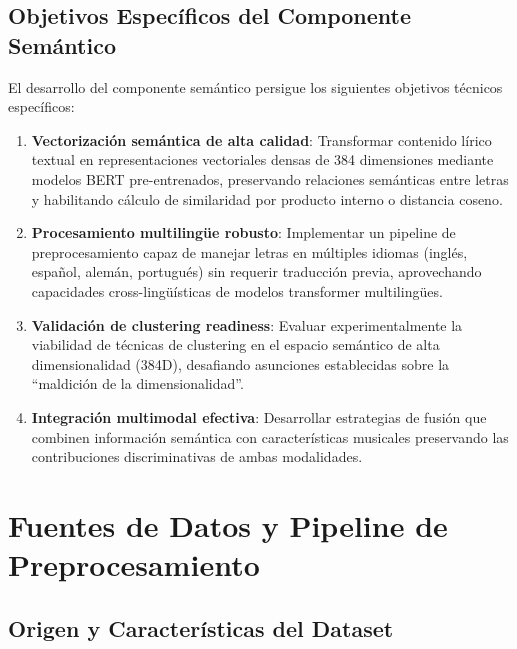 \subsection{Objetivos Específicos del Componente Semántico}
\label{subsec:objetivos-semantico}

El desarrollo del componente semántico persigue los siguientes objetivos técnicos específicos:

\begin{enumerate}
    \item \textbf{Vectorización semántica de alta calidad}: Transformar contenido lírico textual en representaciones vectoriales densas de 384 dimensiones mediante modelos BERT pre-entrenados, preservando relaciones semánticas entre letras y habilitando cálculo de similaridad por producto interno o distancia coseno.

    \item \textbf{Procesamiento multilingüe robusto}: Implementar un pipeline de preprocesamiento capaz de manejar letras en múltiples idiomas (inglés, español, alemán, portugués) sin requerir traducción previa, aprovechando capacidades cross-lingüísticas de modelos transformer multilingües.

    \item \textbf{Validación de clustering readiness}: Evaluar experimentalmente la viabilidad de técnicas de clustering en el espacio semántico de alta dimensionalidad (384D), desafiando asunciones establecidas sobre la ``maldición de la dimensionalidad''.

    \item \textbf{Integración multimodal efectiva}: Desarrollar estrategias de fusión que combinen información semántica con características musicales preservando las contribuciones discriminativas de ambas modalidades.
\end{enumerate}

\section{Fuentes de Datos y Pipeline de Preprocesamiento}
\label{sec:fuentes-datos}

\subsection{Origen y Características del Dataset}
\label{subsec:origen-dataset}

